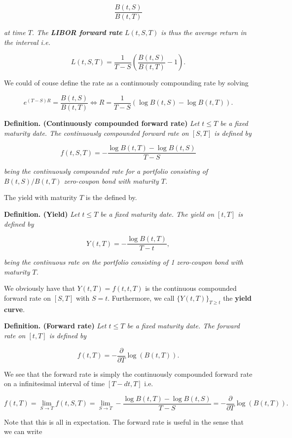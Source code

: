 \documentclass[a4paper,10pt,openany]{book}
\begin{document}
\[
\frac{B(t,S)}{B(t,T)}
\]

\emph{at time \(T\). The \textbf{LIBOR forward rate} \(L(t,S,T)\) is thus the average return in the interval i.e.}

\[
L(t,S,T)=\frac{1}{T-S}\left(\frac{B(t,S)}{B(t,T)}-1\right).
\]

We could of couse define the rate as a continuously compounding rate by solving

\[
e^{(T-S)R}=\frac{B(t,S)}{B(t,T)}\iff R=\frac{1}{T-S}\left(\log B(t,S)-\log B(t,T)\right).
\]

\textbf{Definition. (Continuously compounded forward rate)} \emph{Let \(t\le T\) be a fixed maturity date. The continuously compounded forward rate on \([S,T]\) is defined by}

\[
f(t,S,T)=-\frac{\log B(t,T)-\log B(t,S)}{T-S}
\]

\emph{being the continuously compounded rate for a portfolio consisting of \(B(t,S)/B(t,T)\) zero-coupon bond with maturity \(T\).}

The yield with maturity \(T\) is the defined by.

\textbf{Definition. (Yield)} \emph{Let \(t\le T\) be a fixed maturity date. The yield on \([t,T]\) is defined by}

\[
Y(t,T)=-\frac{\log B(t,T)}{T-t},
\]

\emph{being the continuous rate on the portfolio consisting of 1 zero-coupon bond with maturity \(T\).}

We obviously have that \(Y(t,T)=f(t,t,T)\) is the continuous compounded forward rate on \([S,T]\) with \(S=t\). Furthermore, we call \(\{Y(t,T)\}_{T\ge t}\) the \textbf{yield curve}.

\textbf{Definition. (Forward rate)} \emph{Let \(t\le T\) be a fixed maturity date. The forward rate on \([t,T]\) is defined by}

\[
f(t,T)=-\frac{\partial}{\partial T}\log(B(t,T)).
\]

We see that the forward rate is simply the continuously compounded forward rate on a infinitesimal interval of time \([T-d t,T]\) i.e.

\[
f(t,T)=\lim_{S\to T}f(t,S,T)=\lim_{S\to T}-\frac{\log B(t,T)-\log B(t,S)}{T-S}=-\frac{\partial}{\partial T}\log(B(t,T)).
\]

Note that this is all in expectation. The forward rate is useful in the sense that we can write
\end{document}
